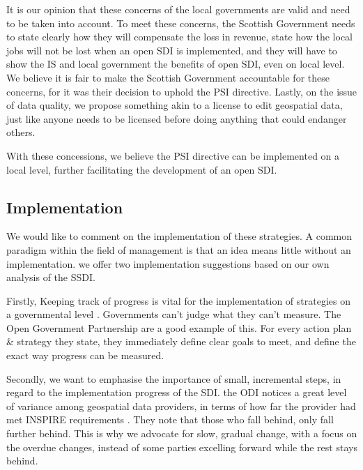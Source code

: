 It is our opinion that these concerns of the local governments are valid and need to be taken into account. To meet these concerns, the Scottish Government needs to state clearly how they will compensate the loss in revenue, state how the local jobs will not be lost when an open SDI is implemented, and they will have to show the IS and local government the benefits of open SDI, even on local level. We believe it is fair to make the Scottish Government accountable for these concerns, for it was their decision to uphold the PSI directive. Lastly, on the issue of data quality, we propose something akin to a license to edit geospatial data, just like anyone needs to be licensed before doing anything that could endanger others. 

With these concessions, we believe the PSI directive can be implemented on a local level, further facilitating the development of an open SDI. 


\subsection{Implementation}

We would like to comment on the implementation of these strategies. A common paradigm within the field of management is that an idea means little without an implementation. we offer two implementation suggestions based on our own analysis of the SSDI.

Firstly, Keeping track of progress is vital for the implementation of strategies on a governmental level \citep{opengovpartnership_mainpage}. Governments can't judge what they can't measure. The Open Government Partnership are a good example of this. For every action plan \& strategy they state, they immediately define clear goals to meet, and define the exact way progress can be measured. 

Secondly, we want to emphasise the importance of small, incremental steps, in regard to the implementation progress of the SDI. the ODI notices a great level of variance among geospatial data providers, in terms of how far the provider had met INSPIRE requirements \citep{odi_geodatainfrastructure}. They note that those who fall behind, only fall further behind. This is why we advocate for slow, gradual change, with a focus on the overdue changes, instead of some parties excelling forward while the rest stays behind. 




